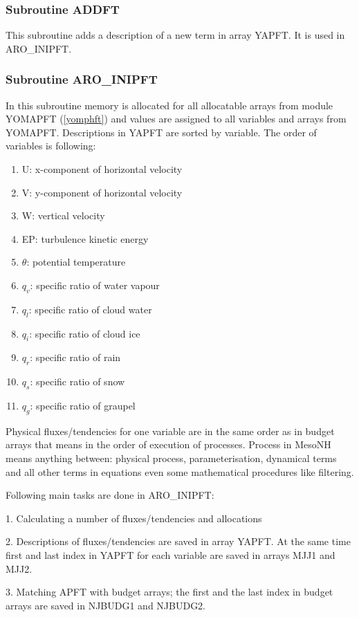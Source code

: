   \subsubsection{Subroutine ADDFT}
This subroutine adds a description of a new term in array YAPFT. It is used in ARO\_INIPFT.

  \subsubsection{Subroutine ARO\_INIPFT}
  \label{aroinipft}
In this subroutine memory is allocated for all allocatable arrays from module YOMAPFT (\ref{yomphft}) and values are assigned to all variables and arrays from YOMAPFT. Descriptions in YAPFT are sorted by variable. The order of variables is following:
\begin{enumerate}
\item{U: } x-component of horizontal velocity
\item{V: } y-component of horizontal velocity
\item{W: } vertical velocity
\item{EP:} turbulence kinetic energy
\item{$\theta$: } potential temperature
\item{$q_v$:} specific ratio of water vapour
\item{$q_l$:} specific ratio of cloud water 
\item{$q_i$:} specific ratio of cloud ice
\item{$q_r$:} specific ratio of rain
\item{$q_s$:} specific ratio of snow
\item{$q_g$:} specific ratio of graupel
\end{enumerate}

Physical fluxes/tendencies for one variable are in the same order as in budget arrays that means in the order of execution of processes. Process in MesoNH means anything between: physical process, parameterisation, dynamical terms and all other terms in equations even some mathematical procedures like filtering. 

Following main tasks are done in ARO\_INIPFT:
\begin{description}
\item{1. }   Calculating a number of fluxes/tendencies and allocations

\item{2. }   Descriptions of fluxes/tendencies are saved in array YAPFT. At the same time first and last index in YAPFT for each variable are saved in arrays MJJ1 and MJJ2.

\item{3. }   Matching APFT with budget arrays; the first and the last index in budget arrays are saved in NJBUDG1 and NJBUDG2. 
\end{description}


